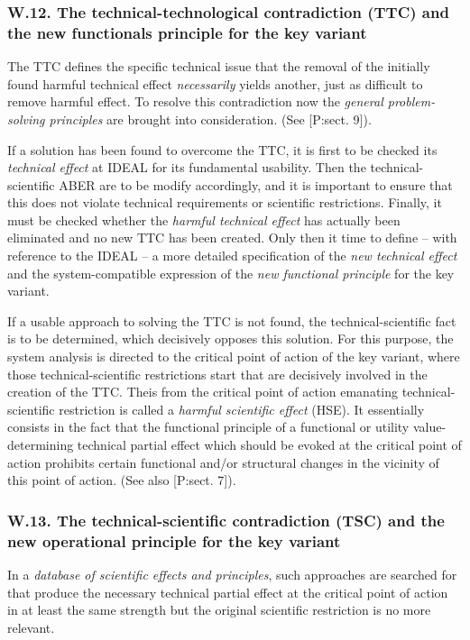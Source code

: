 \documentclass[11pt,a4paper]{article}
\begin{document}
\subsubsection*{W.12. The technical-technological contradiction (TTC) and the
  new functionals principle for the key variant}

The TTC defines the specific technical issue that the removal of the initially
found harmful technical effect \emph{necessarily} yields another, just as
difficult to remove harmful effect. To resolve this contradiction now the
\emph{general problem-solving principles} are brought into consideration. (See
     [P:sect. 9]).

If a solution has been found to overcome the TTC, it is first to be checked
its \emph{technical effect} at IDEAL for its fundamental usability.  Then the
technical-scientific ABER are to be modify accordingly, and it is important to
ensure that this does not violate technical requirements or scientific
restrictions.  Finally, it must be checked whether the \emph{harmful technical
  effect} has actually been eliminated and no new TTC has been created.  Only
then it time to define -- with reference to the IDEAL -- a more detailed
specification of the \emph{new technical effect} and the system-compatible
expression of the \emph{new functional principle} for the key variant.

If a usable approach to solving the TTC is not found, the technical-scientific
fact is to be determined, which decisively opposes this solution.  For this
purpose, the system analysis is directed to the critical point of action of
the key variant, where those technical-scientific restrictions start that are
decisively involved in the creation of the TTC. Theis from the critical point
of action emanating technical-scientific restriction is called a \emph{harmful
  scientific effect} (HSE). It essentially consists in the fact that the
functional principle of a functional or utility value-determining technical
partial effect which should be evoked at the critical point of action
prohibits certain functional and/or structural changes in the vicinity of this
point of action. (See also [P:sect. 7]).

\subsubsection*{W.13. The technical-scientific contradiction (TSC) and the new
  operational principle for the key variant}

In a \emph{database of scientific effects and principles}, such approaches are
searched for that produce the necessary technical partial effect at the
critical point of action in at least the same strength but the original
scientific restriction is no more relevant.
\end{document}
